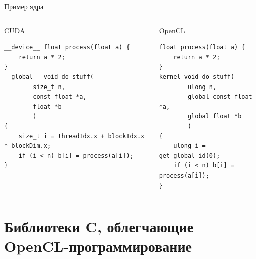 \documentclass[@BEAMER_OPTIONS@]{beamer}
\newcommand{\CXX}{{\rm C}\plusplus}
\begin{document}
\begin{frame}[fragile]{Пример ядра}
    \begin{columns}
        \begin{column}{0.57\textwidth}
            \begin{exampleblock}{CUDA}
                \begin{lstlisting}
__device__ float process(float a) {
    return a * 2;
}
__global__ void do_stuff(
        size_t n,
        const float *a,
        float *b
        )
{
    size_t i = threadIdx.x + blockIdx.x * blockDim.x;
    if (i < n) b[i] = process(a[i]);
}
                \end{lstlisting}
            \end{exampleblock}
        \end{column}
        \begin{column}{0.37\textwidth}
            \begin{exampleblock}{OpenCL}
                \begin{lstlisting}
float process(float a) {
    return a * 2;
}
kernel void do_stuff(
        ulong n,
        global const float *a,
        global float *b
        )
{
    ulong i = get_global_id(0);
    if (i < n) b[i] = process(a[i]);
}
                \end{lstlisting}
            \end{exampleblock}
        \end{column}
    \end{columns}
\end{frame}

\section{Библиотеки \CXX, облегчающие OpenCL-программирование}
\begin{frame}
    \sectionpage
\end{frame}
\end{document}

